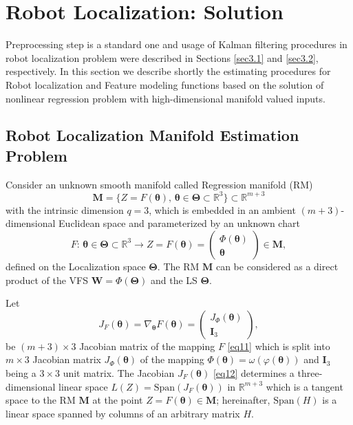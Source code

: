 \documentclass[conference]{IEEEtran} %
\def\mbW{\mathbf{W}}
\def\mbTheta{{\bm\Theta}}
\def\mbtheta{{\bm\theta}}
\def\mbM{\mathbf{M}}
\def\RR{\mathbb{R}}
\begin{document}
\section{Robot Localization: Solution}
\label{sec4}

Preprocessing step is a standard one and usage of Kalman filtering procedures in robot localization problem were described in Sections \ref{sec3.1} and \ref{sec3.2}, respectively. In this section we describe shortly the estimating procedures for Robot localization and Feature modeling functions based on the solution of nonlinear regression problem with high-dimensional manifold valued inputs.

\subsection{Robot Localization Manifold Estimation Problem}

Consider an unknown smooth manifold called Regression manifold (RM)
\begin{equation}
\label{eq10}
	\mbM = \{Z=F(\mbtheta),\,\mbtheta\in\mbTheta\subset\RR^3\}\subset\RR^{m+3}
\end{equation}
with the intrinsic dimension $q = 3$, which is embedded in an ambient $(m+3)$-dimensional Euclidean space and parameterized by an unknown chart
\begin{equation}
\label{eq11}
F:\,\mbtheta\in\mbTheta\subset\RR^3\to Z = F(\mbtheta) = 
\left(
\begin{array}{c}
\Phi(\mbtheta)\\
\mbtheta
\end{array}
\right)
\in\mbM,
\end{equation}    
defined on the Localization space $\mbTheta$. 
The RM $\mbM$ can be considered as a direct product of the VFS $\mbW = \Phi(\mbTheta)$ and the LS $\mbTheta$.

Let 
\begin{equation}
\label{eq12}
J_F(\mbtheta) = \nabla_{\mbtheta}F(\mbtheta) = 
\left(
\begin{array}{c}
J_{\Phi}(\mbtheta)\\
\mathbf{I}_3
\end{array}
\right),
\end{equation}
be $(m+3)\times 3$ Jacobian matrix of the mapping $F$ \eqref{eq11} which is split into $m\times 3$ Jacobian matrix $J_{\Phi}(\mbtheta)$ of the mapping $\Phi(\mbtheta) = \omega(\varphi(\mbtheta))$ and $\mathbf{I}_3$ being a $3\times3$ unit matrix. The Jacobian $J_F(\mbtheta)$ \eqref{eq12} determines a three-dimensional linear space $L(Z) = \mathrm{Span}(J_F(\mbtheta))$ in $\RR^{m+3}$ which is a tangent space to the RM $\mbM$ at the point $Z = F(\mbtheta) \in\mbM$; hereinafter, $\mathrm{Span}(H)$ is a linear space spanned by columns of an arbitrary matrix $H$.
\end{document}
